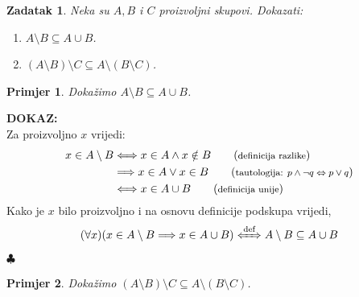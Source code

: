 \documentclass{article}
\newcommand{\kom}[1]{\tag{\textrm{\footnotesize #1}}\\}
\newtheorem{zadatak}{Zadatak}
\newtheorem{primjer}{Primjer}
\newenvironment{dokaz}
    {\noindent\textbf{DOKAZ:}\\} {\hfill $\clubsuit$}
\begin{document}

\begin{zadatak}
    Neka su $A, B$ i $C$ proizvoljni skupovi. Dokazati:
    \begin{enumerate}
        \item $A\setminus B\subseteq A\cup B$.
        \item $(A\setminus B)\setminus C\subseteq A\setminus (B\setminus C)$.
    \end{enumerate}
\end{zadatak}   

\vskip 1cm

\begin{primjer}
    Dokažimo $A\setminus B\subseteq A\cup B$.
\end{primjer}

\begin{dokaz}
    
    Za proizvoljno $x$ vrijedi:
    \begin{align*}
        x\in A\setminus B   &\Longleftrightarrow    x\in A\land x\notin B   \kom{definicija razlike}
                            &\Longrightarrow        x\in A\lor x\in B       \kom{tautologija: $p\land\lnot q \Leftrightarrow p\lor q$}
                            &\Longleftrightarrow    x\in A\cup B            \kom{definicija unije}
    \end{align*}
    Kako je $x$ bilo proizvoljno i na osnovu definicije podskupa vrijedi,
    $$(\forall x)(x\in A\setminus B\Longrightarrow x\in A\cup B)\xLeftrightarrow{\text{def}}A\setminus B\subseteq A\cup B$$
\end{dokaz}

\begin{primjer}
    Dokažimo $(A\setminus B)\setminus C\subseteq A\setminus (B\setminus C)$.
\end{primjer}
\end{document}
